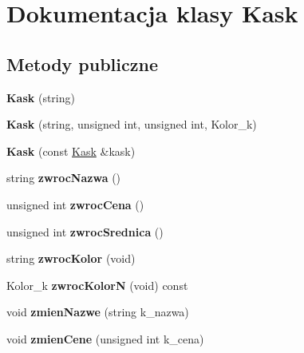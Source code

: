 \hypertarget{class_kask}{}\section{Dokumentacja klasy Kask}
\label{class_kask}
\subsection*{Metody publiczne}
\begin{DoxyCompactItemize}
\item 
\mbox{\label{class_kask_a9d6f69168af42010ca3009547bd8ff43}} 
{\bfseries Kask} (string)
\item 
\mbox{\label{class_kask_ab2e0a0ee02645eb1f5f3ce1a5671d2d0}} 
{\bfseries Kask} (string, unsigned int, unsigned int, Kolor\+\_\+k)
\item 
\mbox{\label{class_kask_a95c8969d275dbcd7693eb974daddb6ee}} 
{\bfseries Kask} (const \hyperlink{class_kask}{Kask} \&kask)
\item 
\mbox{\label{class_kask_ab1aee9ce929f776824c3931ab236cb69}} 
string {\bfseries zwroc\+Nazwa} ()
\item 
\mbox{\label{class_kask_a24199eaad772b42465c66692b8edfa99}} 
unsigned int {\bfseries zwroc\+Cena} ()
\item 
\mbox{\label{class_kask_a4682c0f3f1b9fce124d4d81bff19ff92}} 
unsigned int {\bfseries zwroc\+Srednica} ()
\item 
\mbox{\label{class_kask_a20878029169fa45fd4499abd8374b3d5}} 
string {\bfseries zwroc\+Kolor} (void)
\item 
\mbox{\label{class_kask_a9c31b947c5304758b8c1382404f239db}} 
Kolor\+\_\+k {\bfseries zwroc\+KolorN} (void) const
\item 
\mbox{\label{class_kask_a89eb4c4acdc0b143bdfd8837d7bbb502}} 
void {\bfseries zmien\+Nazwe} (string k\+\_\+nazwa)
\item 
\mbox{\label{class_kask_a5782fca051e92ff55d484e3ebbcdb9a3}} 
void {\bfseries zmien\+Cene} (unsigned int k\+\_\+cena)

\end{DoxyCompactItemize}
